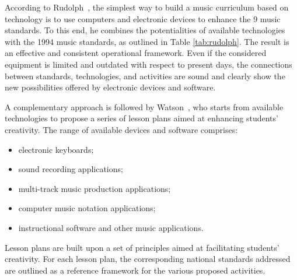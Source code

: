 \documentclass[10pt,journal,compsoc]{IEEEtran}
\begin{document}
According to Rudolph~\cite{rudolph2004teaching}, the simplest way to build a music curriculum based on technology is to use computers and electronic devices to enhance the 9 music standards. To this end, he combines the potentialities of available technologies with the 1994 music standards, as outlined in Table \ref{tab:rudolph}. The result is an effective and consistent operational framework. Even if the considered equipment is limited and outdated with respect to present days, the connections between standards, technologies, and activities are sound and clearly show the new possibilities offered by electronic devices and software. 

A complementary approach is followed by Watson~\cite{watson2011using}, who starts from available technologies to propose a series of lesson plans aimed at enhancing students' creativity. The range of available devices and software comprises:
\begin{itemize}
	\item electronic keyboards;
	\item sound recording applications;
	\item multi-track music production applications;
	\item computer music notation applications;
	\item instructional software and other music applications.
\end{itemize}

Lesson plans are built upon a set of principles aimed at facilitating students' creativity.
For each lesson plan, the corresponding national standards addressed are outlined as a reference framework for the various proposed activities.
\end{document}
